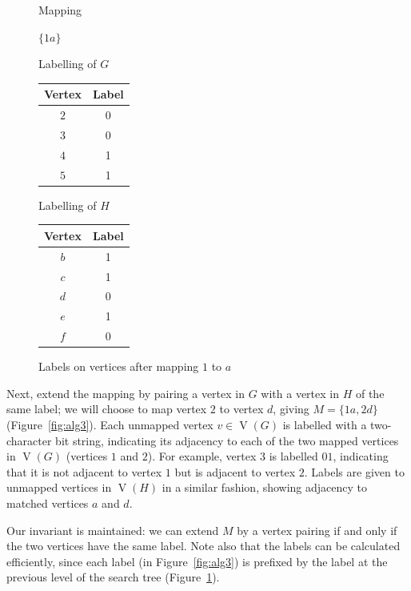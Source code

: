 \documentclass[letterpaper]{article}
\DeclareMathOperator{\V}{V}
\begin{document}
\begin{figure}[ht]
\centering
\begin{minipage}[t]{0.15\linewidth}
    Mapping

    \bigskip

    $\{1a\}$
\end{minipage}
\quad
\begin{minipage}[t]{0.3\linewidth}
    Labelling of $G$
    \begin{tabular}[t]{cc}
    \hline
        Vertex & Label\\
    \hline
        $2$ & 0 \\
        $3$ & 0 \\
        $4$ & 1 \\
        $5$ & 1 \\
    \hline
    \end{tabular}
\end{minipage}
\quad
\begin{minipage}[t]{0.3\linewidth}
    Labelling of $H$
    \begin{tabular}[t]{cc}
    \hline
        Vertex & Label\\
    \hline
        $b$ & 1 \\
        $c$ & 1 \\
        $d$ & 0 \\
        $e$ & 1 \\
        $f$ & 0 \\
    \hline
    \end{tabular}
\end{minipage}
    \caption{Labels on vertices after mapping $1$ to $a$}
\label{fig:alg2}
\end{figure}

Next, extend the mapping by pairing a vertex in $G$ with a vertex in $H$ of the
same label; we will choose to map vertex $2$ to vertex $d$, giving $M=\{1a,
2d\}$ (Figure~\ref{fig:alg3}).  Each unmapped vertex $v \in \V(G)$ is labelled
with a two-character bit string, indicating its adjacency to each of
the two mapped vertices in $\V(G)$ (vertices $1$ and $2$).  For example, vertex
$3$ is labelled $01$, indicating that it is not adjacent to vertex $1$ but is adjacent
to vertex $2$.  Labels are given to unmapped vertices in $\V(H)$ in a similar fashion,
showing adjacency to matched vertices $a$ and $d$.

Our invariant is maintained: we can extend $M$ by a vertex pairing if and only
if the two vertices have the same label. Note also that the labels can be
calculated efficiently, since each label (in Figure~\ref{fig:alg3}) is prefixed
by the label at the previous level of the search tree (Figure~\ref{fig:alg2}).
\end{document}

